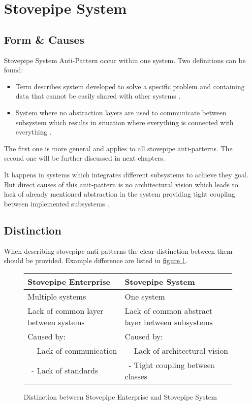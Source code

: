 \section{Stovepipe System}

\subsection{Form \& Causes}
Stovepipe System Anti-Pattern occur within one system. Two definitions can be found:
\begin{itemize}
\item Term describes system developed to solve a specific problem and containing data that cannot be easily shared with other systems \cite{c2com}.
\item System where no abstraction layers are used to communicate between subsystem which results in situation where everything is connected with everything \cite{Virtual}.
\end{itemize}
The first one is more general and applies to all stovepipe anti-patterns.
The second one will be further discussed in next chapters.

It happens in systems which integrates different subsystems to achieve they goal. But direct causes of this anit-pattern is no architectural vision which leads to lack of already mentioned abstraction in the system providing tight coupling between implemented subsystems \cite{SurvivalGuide}.


\subsection{Distinction}

When describing stovepipe anti-patterns the clear distinction between them should be provided. Example difference are listed in \hyperref[tab:Distinction]{figure \ref{tab:Distinction}}.

\def\arraystretch{1.6}
\begin{center}
\begin{figure}[!h]
	\begin{tabular}{|p{.48\linewidth}|p{.48\linewidth}|}
	    \hline
	    Stovepipe Enterprise & Stovepipe System \\
	    \hline
	    Multiple systems & One system \\
	    Lack of common layer between systems & Lack of common abstract layer between subsystems \\
	    Caused by: & Caused by: \\
	    \ - Lack of communication & \ - Lack of architectural vision \\
	    \ - Lack of standards & \  - Tight coupling between classes \\
	    \hline
	\end{tabular}
\caption{Distinction between Stovepipe Enterprise and Stovepipe System}
\label{tab:Distinction}
\end{figure}
\end{center}

